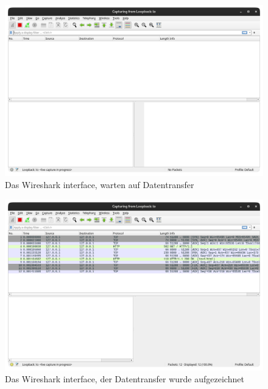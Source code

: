 \documentclass[12pt]{article}
\begin{document}
\begin{figure}[h]
	\centering
	\includegraphics[scale=0.3]{Bilder/Anlagen_2}
	\caption{Das Wireshark interface, warten auf Datentransfer \cite{screenshots-self}}
	\label{fig:figure31}
\end{figure}

\begin{figure}[h]
	\centering
	\includegraphics[scale=0.3]{Bilder/Anlagen_3}
	\caption{Das Wireshark interface, der Datentransfer wurde aufgezeichnet \cite{screenshots-self}}
	\label{fig:figure32}
\end{figure}
\end{document}
